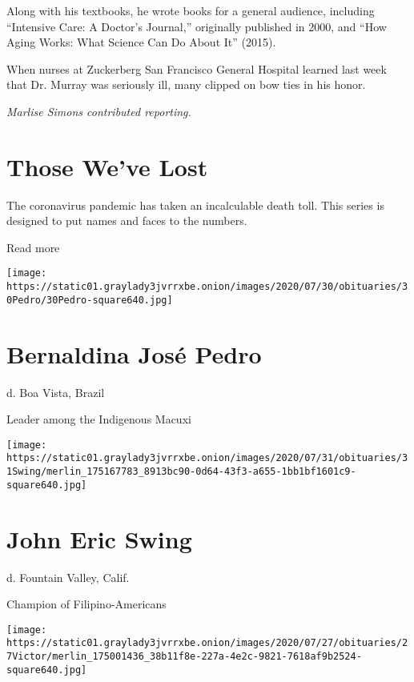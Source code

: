 Along with his textbooks, he wrote books for a general audience,
including ``Intensive Care: A Doctor's Journal,'' originally published
in 2000, and ``How Aging Works: What Science Can Do About It'' (2015).

When nurses at Zuckerberg San Francisco General Hospital learned last
week that Dr. Murray was seriously ill, many clipped on bow ties in his
honor.

\emph{Marlise Simons contributed reporting.}

\href{https://www.nytimes3xbfgragh.onion/interactive/2020/obituaries/people-died-coronavirus-obituaries.html?action=click\&pgtype=Article\&state=default\&region=BELOW_MAIN_CONTENT\&context=covid_obits_promo}{}

\hypertarget{those-weve-lost}{%
\section{Those We've Lost}\label{those-weve-lost}}

The coronavirus pandemic has taken an incalculable death toll. This
series is designed to put names and faces to the numbers.

Read more

\texttt{[image: https://static01.graylady3jvrrxbe.onion/images/2020/07/30/obituaries/30Pedro/30Pedro-square640.jpg]}

\hypertarget{bernaldina-josuxe9-pedro}{%
\section{Bernaldina José Pedro}\label{bernaldina-josuxe9-pedro}}

d. Boa Vista, Brazil

Leader among the Indigenous Macuxi

\texttt{[image: https://static01.graylady3jvrrxbe.onion/images/2020/07/31/obituaries/31Swing/merlin\_175167783\_8913bc90-0d64-43f3-a655-1bb1bf1601c9-square640.jpg]}

\hypertarget{john-eric-swing}{%
\section{John Eric Swing}\label{john-eric-swing}}

d. Fountain Valley, Calif.

Champion of Filipino-Americans

\texttt{[image: https://static01.graylady3jvrrxbe.onion/images/2020/07/27/obituaries/27Victor/merlin\_175001436\_38b11f8e-227a-4e2c-9821-7618af9b2524-square640.jpg]}

